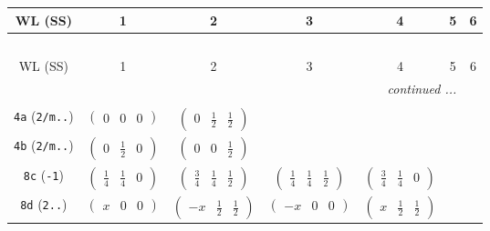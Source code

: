\documentclass[fleqn,9pt,landscape]{jsarticle}
\begin{document}
\begin{center}
\renewcommand{\arraystretch}{1.2}
\begin{longtable}{ccccccc}
 \hline \hline
WL (SS) & 1 & 2 & 3 & 4 & 5 & 6 \\ \hline \endfirsthead

\multicolumn{6}{l}{\tablename\ \thetable{}} \\
 \hline \hline
WL (SS) & 1 & 2 & 3 & 4 & 5 & 6 \\ \hline \endhead

 \hline \hline
\multicolumn{6}{r}{\footnotesize\it continued ...} \\ \endfoot

 \hline \hline
\multicolumn{6}{r}{} \\ \endlastfoot

{\tt 4a} ({\tt 2/m..}) & $ \begin{pmatrix} 0 & 0 & 0 \end{pmatrix} $ & $ \begin{pmatrix} 0 & \frac{1}{2} & \frac{1}{2} \end{pmatrix} $ & $  $ & $  $ & $  $ & $  $ \\ \hline
{\tt 4b} ({\tt 2/m..}) & $ \begin{pmatrix} 0 & \frac{1}{2} & 0 \end{pmatrix} $ & $ \begin{pmatrix} 0 & 0 & \frac{1}{2} \end{pmatrix} $ & $  $ & $  $ & $  $ & $  $ \\ \hline
{\tt 8c} ({\tt -1}) & $ \begin{pmatrix} \frac{1}{4} & \frac{1}{4} & 0 \end{pmatrix} $ & $ \begin{pmatrix} \frac{3}{4} & \frac{1}{4} & \frac{1}{2} \end{pmatrix} $ & $ \begin{pmatrix} \frac{1}{4} & \frac{1}{4} & \frac{1}{2} \end{pmatrix} $ & $ \begin{pmatrix} \frac{3}{4} & \frac{1}{4} & 0 \end{pmatrix} $ & $  $ & $  $ \\ \hline
{\tt 8d} ({\tt 2..}) & $ \begin{pmatrix} x & 0 & 0 \end{pmatrix} $ & $ \begin{pmatrix} - x & \frac{1}{2} & \frac{1}{2} \end{pmatrix} $ & $ \begin{pmatrix} - x & 0 & 0 \end{pmatrix} $ & $ \begin{pmatrix} x & \frac{1}{2} & \frac{1}{2} \end{pmatrix} $ & $  $ & $  $ \\ \hline

\end{longtable}
\end{center}
\end{document}

